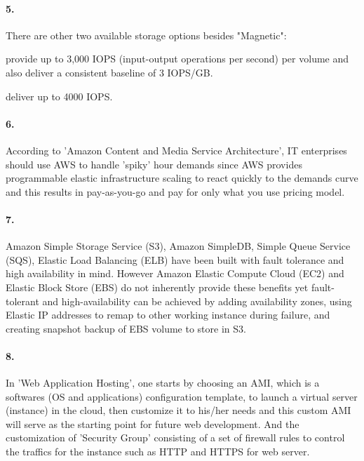 \documentclass[a4paper]{article}
\begin{document}
\paragraph{5. } There are other two available storage options besides "Magnetic":
\begin{description}
\leftskip 0.4in
\parindent -0.4in
	\item[General Purpose (SSD): ] provide up to 3,000 IOPS (input-output operations per second) per volume and also deliver a consistent baseline of 3 IOPS/GB.
	\item[Provisioned IOPS (SSD): ] deliver up to 4000 IOPS.
\end{description}

\paragraph{6. } According to 'Amazon Content and Media Service Architecture', IT enterprises should use AWS to handle 'spiky' hour demands since AWS provides programmable elastic infrastructure scaling to react quickly to the demands curve and this results in pay-as-you-go and pay for only what you use pricing model.

\paragraph{7. } Amazon Simple Storage Service (S3), Amazon SimpleDB, Simple Queue Service (SQS), Elastic Load Balancing (ELB) have been built with fault tolerance and high availability in mind. However Amazon Elastic Compute Cloud (EC2) and Elastic Block Store (EBS) do not inherently provide these benefits yet fault-tolerant and high-availability can be achieved by adding availability zones, using Elastic IP addresses to remap to other working instance during failure, and creating snapshot backup of EBS volume to store in S3.

\paragraph{8. } In 'Web Application Hosting', one starts by choosing an AMI, which is a softwares (OS and applications) configuration template, to launch a virtual server (instance) in the cloud, then customize it to his/her needs and this custom AMI will serve as the starting point for future web development. And the customization of 'Security Group' consisting of a set of firewall rules to control the traffics for the instance such as HTTP and HTTPS for web server.
\end{document}
